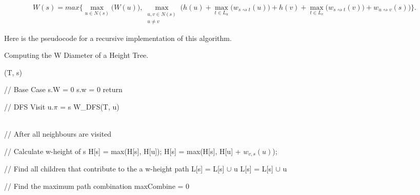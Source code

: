$$ W(s) = max\Bigg\{ \max\limits_{u \in N(s)}\bigg(W(u)\bigg), \max\limits_{\substack{u, v \in N(s) \\ u \ne v}} \bigg( h(u) + \max\limits_{t \in L_u}\Big(w_{s \rightsquigarrow t}(u)\Big) + h(v) + \max\limits_{t \in L_v}\Big(w_{s \rightsquigarrow t}(v)\Big) + w_{u \rightsquigarrow v}(s) \bigg) \Bigg\}. $$

Here is the pseudocode for a recursive implementation of this algorithm.


\begin{algorithm}{}
\caption{Computing the W Diameter of a Height Tree.}
\begin{algorithmic}[1]

    (T, s)

    \State // Base Case
        \State s.W = 0
        \State s.w = 0
        \State return
    \EndIf


    \State // DFS Visit
            \State u.$\pi$ = s
            \State W\_DFS(T, u)
        \EndIf
    \EndFor

    \\

    \State // After all neighbours are visited

    \State // Calculate w-height of s
            \State H[s] = max(H[s], H[u]);
        \Else
                \State H[s] = max(H[s], H[u] + $w_{v, s}(u)$);
            \EndFor
        \EndIf
    \EndFor

    \State // Find all children that contribute to the a w-height path
            \State L[s] = L[s] $\cup$ u
        \Else
                    \State L[s] = L[s] $\cup$ u
                \EndIf
            \EndFor
        \EndIf
    \EndFor

    \State // Find the maximum path combination
    \State maxCombine = 0



\end{algorithmic}
\end{algorithm}
